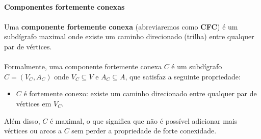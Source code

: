 \documentclass[12pt,a4paper]{article}
\begin{document}
\paragraph{Componentes fortemente conexas}
\paragraph{}Uma \textbf{componente fortemente conexa} (abreviaremos como \textbf{CFC}) é um subdígrafo maximal onde existe um caminho direcionado (trilha) entre qualquer par de vértices. 

\paragraph{}
Formalmente, uma componente fortemente conexa \(C\) é um subdígrafo \(C = (V_C, A_C)\) onde \(V_C \subseteq V\) e \(A_C \subseteq A\), que satisfaz a seguinte propriedade:
\begin{itemize}
    \item \(C\) é fortemente conexo: existe um caminho direcionado entre qualquer par de vértices em \(V_C\).
\end{itemize}
Além disso, \(C\) é maximal, o que significa que não é possível adicionar mais vértices ou arcos a \(C\) sem perder a propriedade de forte conexidade.
\end{document}
